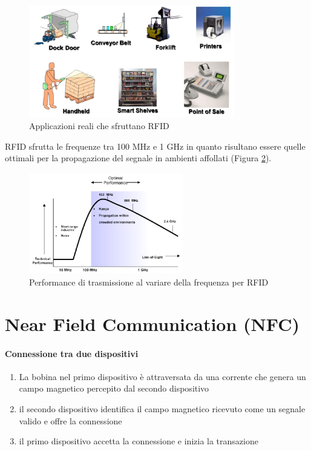 	\begin{figure}[h]
		\centering
		\includegraphics[width=0.8\textwidth]{lez7/useCasesRFID.png}
		\caption{Applicazioni reali che sfruttano RFID}
		\label{fig:useCasesRFID}
	\end{figure}

	RFID sfrutta le frequenze tra 100 MHz e 1 GHz in quanto risultano essere quelle ottimali per la propagazione del segnale in ambienti affollati (Figura \ref{fig:frequenzaOttimale}).
	
	\begin{figure}[h]
		\centering
		\includegraphics[width=0.6\textwidth]{lez7/optimalFrequency.png}
		\caption{Performance di trasmissione al variare della frequenza per RFID}
		\label{fig:frequenzaOttimale}
	\end{figure}


\section{Near Field Communication (NFC)}

	\paragraph{Connessione tra due dispositivi}
	\begin{enumerate}
		\item La bobina nel primo dispositivo è attraversata da una corrente che genera un campo magnetico percepito dal secondo dispositivo
		\item il secondo dispositivo identifica il campo magnetico ricevuto come un segnale valido e offre la connessione
		\item il primo dispositivo accetta la connessione e inizia la transazione
	\end{enumerate}

